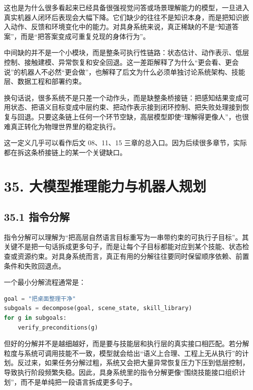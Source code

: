 这也是为什么很多看起来已经具备很强视觉问答或场景理解能力的模型，一旦进入真实机器人闭环后表现会大幅下降。它们缺少的往往不是知识本身，而是把知识嵌入动作、反馈和环境变化中的能力。对具身系统来说，真正稀缺的不是“知道答案”，而是“把答案变成可重复兑现的身体行为”。

中间缺的并不是一个小模块，而是整条可执行性链路：状态估计、动作表示、低层控制、接触建模、异常恢复和安全回退。这一差距解释了为什么“更会看、更会说”的机器人不必然“更会做”，也解释了后文为什么必须单独讨论系统架构、技能层、数据工程和部署约束。

换句话说，很多系统不是只差一个动作头，而是缺整条桥接链：把感知结果变成可用状态、把语义目标变成中层约束、把动作表示接到闭环控制、把失败处理接到恢复与回退。只要这条链上任何一个环节空缺，高层模型即使“理解得更像人”，也很难真正转化为物理世界里的稳定执行。

这一定义几乎可以看作后文 08、11、15 三章的总入口。因为后续很多章节，实际都在拆这条桥接链上的某一个关键缺口。

\section*{35. 大模型推理能力与机器人规划}

\subsection*{35.1 指令分解}


指令分解可以理解为“把高层自然语言目标重写为一串带约束的可执行子目标”。其关键不是把一句话拆成更多句子，而是让每个子目标都能对应到某个技能、状态检查或资源约束。对具身系统而言，真正有用的分解往往要同时保留顺序依赖、前置条件和失败回退点。

一个最小分解流程通常是：

\begin{lstlisting}[language=python]
goal = "把桌面整理干净"
subgoals = decompose(goal, scene_state, skill_library)
for g in subgoals:
    verify_preconditions(g)
\end{lstlisting}

但好的分解并不是越细越好，而是要与技能层和执行层的真实接口相匹配。若分解粒度与系统可调用技能不一致，模型就会给出“语义上合理、工程上无从执行”的计划。反过来，如果任务分解过粗，系统又会把大量异常恢复压力下压到低层控制，导致执行阶段频繁失稳。因此，具身系统里的指令分解更像“围绕技能接口组织计划”，而不是单纯把一段语言拆成更多句子。

